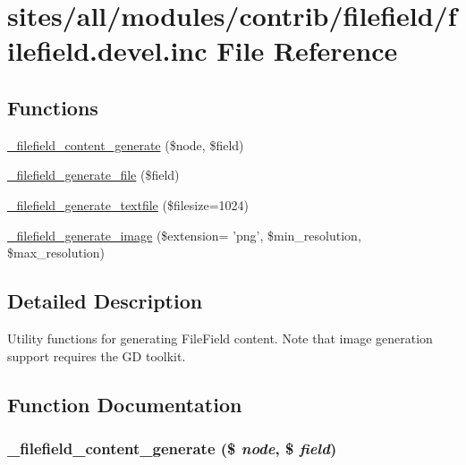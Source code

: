 \hypertarget{filefield_8devel_8inc}{
\section{sites/all/modules/contrib/filefield/filefield.devel.inc File Reference}
\label{filefield_8devel_8inc}
}
\subsection*{Functions}
\begin{CompactItemize}
\item 
\hyperlink{filefield_8devel_8inc_9ba053d2dfbae4508a467564b75fdbec}{\_\-filefield\_\-content\_\-generate} (\$node, \$field)
\item 
\hyperlink{filefield_8devel_8inc_d00f635cf5efbb788362e6da3af48427}{\_\-filefield\_\-generate\_\-file} (\$field)
\item 
\hyperlink{filefield_8devel_8inc_705cf7c67b9e42aae82a3b208449ac6a}{\_\-filefield\_\-generate\_\-textfile} (\$filesize=1024)
\item 
\hyperlink{filefield_8devel_8inc_d445fcfee3758c9ddb23429c42c29597}{\_\-filefield\_\-generate\_\-image} (\$extension= 'png', \$min\_\-resolution, \$max\_\-resolution)
\end{CompactItemize}


\subsection{Detailed Description}
Utility functions for generating FileField content. Note that image generation support requires the GD toolkit. 

\subsection{Function Documentation}
\hypertarget{filefield_8devel_8inc_9ba053d2dfbae4508a467564b75fdbec}{
\subsubsection[{\_\-filefield\_\-content\_\-generate}]{\setlength{\rightskip}{0pt plus 5cm}\_\-filefield\_\-content\_\-generate (\$ {\em node}, \/  \$ {\em field})}}
\label{filefield_8devel_8inc_9ba053d2dfbae4508a467564b75fdbec}


